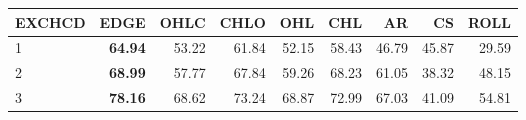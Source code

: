 \begin{table}[ht]
\centering
\begin{tabular}{lrrrrrrrr}
  \hline
EXCHCD & EDGE & OHLC & CHLO & OHL & CHL & AR & CS & ROLL \\ 
  \hline
1 & \textbf{64.94} & 53.22 & 61.84 & 52.15 & 58.43 & 46.79 & 45.87 & 29.59 \\ 
  2 & \textbf{68.99} & 57.77 & 67.84 & 59.26 & 68.23 & 61.05 & 38.32 & 48.15 \\ 
  3 & \textbf{78.16} & 68.62 & 73.24 & 68.87 & 72.99 & 67.03 & 41.09 & 54.81 \\ 
   \hline
\end{tabular}
\end{table}

